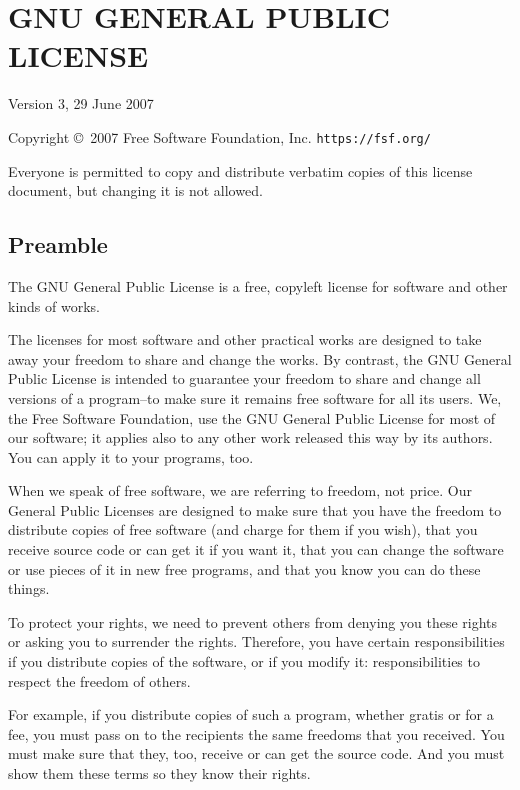 \documentclass{article}
\begin{document}
\newpage
\section{GNU GENERAL PUBLIC LICENSE}

\begin{center}
{\parindent 0in

Version 3, 29 June 2007

\bigskip
Copyright \copyright\  2007 Free Software Foundation, Inc. \texttt{https://fsf.org/}

\bigskip
Everyone is permitted to copy and distribute verbatim copies of this
license document, but changing it is not allowed.}

\end{center}

\subsection{Preamble}
The GNU General Public License is a free, copyleft license for software and other kinds of works.

The licenses for most software and other practical works are designed to take away your freedom to share and change the works.  By contrast, the GNU General Public License is intended to guarantee your freedom to share and change all versions of a program--to make sure it remains free software for all its users.  We, the Free Software Foundation, use the GNU General Public License for most of our software; it applies also to any other work released this way by its authors.  You can apply it to your programs, too.

When we speak of free software, we are referring to freedom, not price.  Our General Public Licenses are designed to make sure that you have the freedom to distribute copies of free software (and charge for them if you wish), that you receive source code or can get it if you want it, that you can change the software or use pieces of it in new free programs, and that you know you can do these things.

To protect your rights, we need to prevent others from denying you these rights or asking you to surrender the rights.  Therefore, you have certain responsibilities if you distribute copies of the software, or if you modify it: responsibilities to respect the freedom of others.

For example, if you distribute copies of such a program, whether gratis or for a fee, you must pass on to the recipients the same freedoms that you received.  You must make sure that they, too, receive or can get the source code.  And you must show them these terms so they know their rights.
\end{document}
